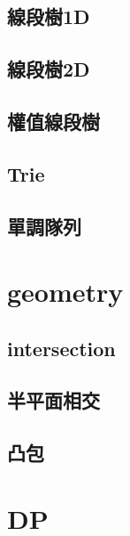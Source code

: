     \subsection{線段樹1D}
        
    \subsection{線段樹2D}
        
    \subsection{權值線段樹}
        
    \subsection{Trie}
        
    \subsection{單調隊列}
        
        
\section{geometry}
    \subsection{intersection}
        
    \subsection{半平面相交}
        
    \subsection{凸包}
        

\section{DP}
